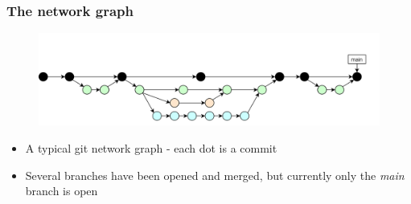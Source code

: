 \documentclass[aspectratio=169]{beamer} %
\begin{document}
\begin{frame}
	\frametitle{The network graph}

	\vspace{-.5cm}
	\begin{minipage}[t][5cm][t]{\textwidth}
		\begin{figure}
			\centering
			\includegraphics[width=\textwidth]{./img/dime-gitflow-network.png}
		\end{figure}
	\end{minipage}

	\vspace{-.5cm}
	\begin{minipage}[t][5cm][t]{\textwidth}
		\begin{itemize}
			\setlength\itemsep{.5em}
			\item A typical git network graph - each dot is a commit
			\item Several branches have been opened and merged,
			but currently only the \textit{main} branch is open
		\end{itemize}
	\end{minipage}

\end{frame}
\end{document}
